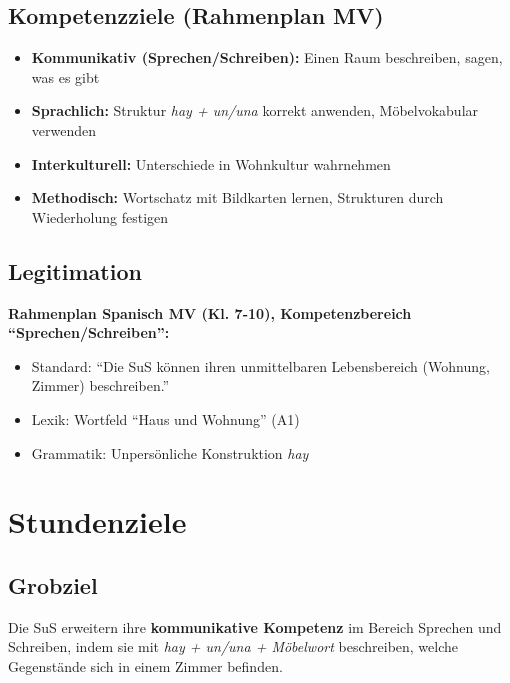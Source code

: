 \documentclass[11pt,a4paper]{article}
\begin{document}
\subsection{Kompetenzziele (Rahmenplan MV)}
\begin{itemize}
    \item \textbf{Kommunikativ (Sprechen/Schreiben):} Einen Raum beschreiben, sagen, was es gibt
    \item \textbf{Sprachlich:} Struktur \textit{hay + un/una} korrekt anwenden, Möbelvokabular verwenden
    \item \textbf{Interkulturell:} Unterschiede in Wohnkultur wahrnehmen
    \item \textbf{Methodisch:} Wortschatz mit Bildkarten lernen, Strukturen durch Wiederholung festigen
\end{itemize}

\subsection{Legitimation}
\textbf{Rahmenplan Spanisch MV (Kl. 7-10), Kompetenzbereich ``Sprechen/Schreiben'':}
\begin{itemize}
    \item Standard: ``Die SuS können ihren unmittelbaren Lebensbereich (Wohnung, Zimmer) beschreiben.''
    \item Lexik: Wortfeld ``Haus und Wohnung'' (A1)
    \item Grammatik: Unpersönliche Konstruktion \textit{hay}
\end{itemize}

\section{Stundenziele}

\subsection{Grobziel}
Die SuS erweitern ihre \textbf{kommunikative Kompetenz} im Bereich Sprechen und Schreiben, indem sie mit \textit{hay + un/una + Möbelwort} beschreiben, welche Gegenstände sich in einem Zimmer befinden.
\end{document}
